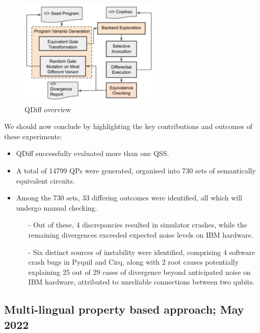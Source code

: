 \begin{itemize}
    \begin{figure}[H]
        \centering
        \includegraphics[width=0.6\textwidth]{TFM/photos/QDiffWorkoverflow.png}
        \caption{QDiff overview \cite{wang2021qdiff}} 
        \label{Fig:QDiffWorkOverflow}
    \end{figure}

    We should now conclude by highlighting the key contributions and outcomes of these experiments:

\begin{itemize}
    \item QDiff successfully evaluated more than one QSS.
    \item A total of 14799 QPs were generated, organised into 730 sets of semantically equivalent circuits.
    \item Among the 730 sets, 33 differing outcomes were identified, all which will undergo manual checking.
    \begin{itemize}
        \item[-] Out of these, 4 discrepancies resulted in simulator crashes, while the remaining divergences exceeded expected noise levels on IBM hardware.
        \item[-] Six distinct sources of instability were identified, comprising 4 software crash bugs in Pyquil and Cirq, along with 2 root causes potentially explaining 25 out of 29 cases of divergence beyond anticipated noise on IBM hardware, attributed to unreliable connections between two qubits.
    \end{itemize}
    
\end{itemize}

\vspace{15pt}
\subsection{Multi-lingual property based approach; May 2022}


\end{itemize}
